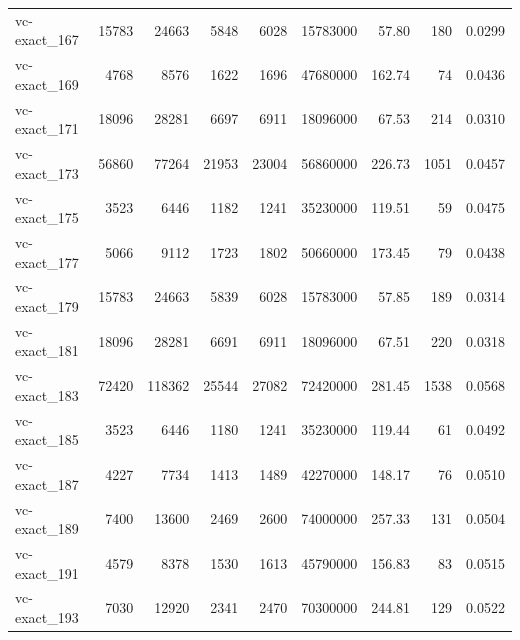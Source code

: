 {\begin{longtable}{lrrrrrrrr}
vc-exact\_167 & 15783 & 24663 & 5848 & 6028 & 15783000 & 57.80 & 180 & 0.0299 \\
vc-exact\_169 & 4768 & 8576 & 1622 & 1696 & 47680000 & 162.74 & 74 & 0.0436 \\
vc-exact\_171 & 18096 & 28281 & 6697 & 6911 & 18096000 & 67.53 & 214 & 0.0310 \\
vc-exact\_173 & 56860 & 77264 & 21953 & 23004 & 56860000 & 226.73 & 1051 & 0.0457 \\
vc-exact\_175 & 3523 & 6446 & 1182 & 1241 & 35230000 & 119.51 & 59 & 0.0475 \\
vc-exact\_177 & 5066 & 9112 & 1723 & 1802 & 50660000 & 173.45 & 79 & 0.0438 \\
vc-exact\_179 & 15783 & 24663 & 5839 & 6028 & 15783000 & 57.85 & 189 & 0.0314 \\
vc-exact\_181 & 18096 & 28281 & 6691 & 6911 & 18096000 & 67.51 & 220 & 0.0318 \\
vc-exact\_183 & 72420 & 118362 & 25544 & 27082 & 72420000 & 281.45 & 1538 & 0.0568 \\
vc-exact\_185 & 3523 & 6446 & 1180 & 1241 & 35230000 & 119.44 & 61 & 0.0492 \\
vc-exact\_187 & 4227 & 7734 & 1413 & 1489 & 42270000 & 148.17 & 76 & 0.0510 \\
vc-exact\_189 & 7400 & 13600 & 2469 & 2600 & 74000000 & 257.33 & 131 & 0.0504 \\
vc-exact\_191 & 4579 & 8378 & 1530 & 1613 & 45790000 & 156.83 & 83 & 0.0515 \\
vc-exact\_193 & 7030 & 12920 & 2341 & 2470 & 70300000 & 244.81 & 129 & 0.0522 \\
\end{longtable}}

